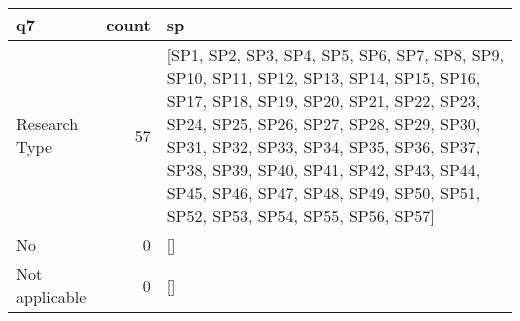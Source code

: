 \begin{tabular}{lrl}
\toprule
             q7 &  count &                                                                                                                                                                                                                                                                                                                                             sp \\
\midrule
 Research Type &  57 &  [SP1, SP2, SP3, SP4, SP5, SP6, SP7, SP8, SP9, SP10, SP11, SP12, SP13, SP14, SP15, SP16, SP17, SP18, SP19, SP20, SP21, SP22, SP23, SP24, SP25, SP26, SP27, SP28, SP29, SP30, SP31, SP32, SP33, SP34, SP35, SP36, SP37, SP38, SP39, SP40, SP41, SP42, SP43, SP44, SP45, SP46, SP47, SP48, SP49, SP50, SP51, SP52, SP53, SP54, SP55, SP56, SP57] \\
 No &  0 &  [] \\
 Not applicable &  0 &  [] \\
\bottomrule
\end{tabular}
